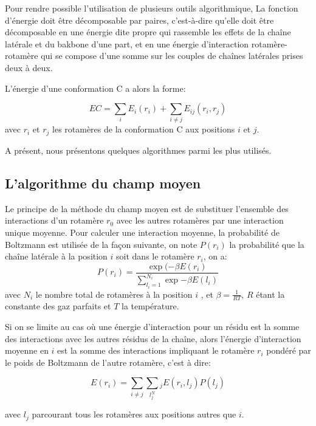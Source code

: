 Pour rendre possible l'utilisation de plusieurs outils algorithmique, La fonction d'énergie doit être décomposable par paires, c'est-à-dire qu'elle doit être décomposable en une énergie dite propre qui rassemble les effets de la chaîne latérale et du bakbone d'une part, et en une énergie d'interaction rotamère-rotamère qui se compose d'une somme sur les couples de chaînes latérales prises deux à deux.

L'énergie d'une conformation C a alors la forme:

\begin{equation}
E{C} = \sum_i E_i(r_i) + \sum_{i\neq j} E_{ij}(r_i,r_j)
\end{equation}
avec $r_i$ et $r_j$ les rotamères de la conformation C aux positions $i$ et $j$.

A présent, nous présentons quelques algorithmes parmi les plus utilisés.

\subsection{L'algorithme du champ moyen}
Le principe de la méthode du champ moyen est de substituer l'ensemble des interactions d'un rotamère $r_0$ avec les autres rotamères par une interaction unique moyenne. Pour calculer une interaction moyenne, la probabilité de Boltzmann est utilisée de la façon suivante, on note $P(r_{i})$ la probabilité que la chaîne latérale à la position $i$ soit dans le rotamère $r_i$, on a:
\begin{equation}
  \label{eq:CM1}
P(r_i) =\frac{\exp(-\beta E(r_{i})}{\sum_{l_i=1}^{N_i} \exp{-\beta E(l_i)}}
\end{equation}
avec $N_i$ le nombre total de rotamères à la position $i$ , et $\beta = \frac{1}{RT}$,  $R$ étant la constante des gaz parfaits et $T$ la température.

Si on se limite au cas où une énergie d'interaction pour un résidu est la somme des interactions avec les autres résidus de la chaîne, alors l'énergie d'interaction moyenne en $i$ est la somme des interactions impliquant le rotamère $r_i$ pondéré par le poids de Boltzmann de l'autre rotamère, c'est à dire:

\begin{equation}
    \label{eq:CM2}
E(r_i) = \sum_{i \neq j} \sum_l_j^N_j E(r_i,l_j)P(l_j)
\end{equation}  

avec $l_j$ parcourant tous les rotamères aux positions autres que $i$.

